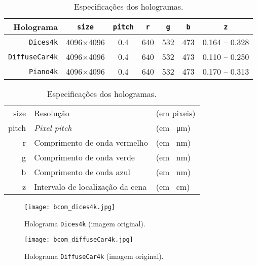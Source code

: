 \begin{table}[!htbp]
    \centering
    \caption[Especificações dos hologramas]{Especificações dos hologramas\cite{holorepo2018}.}
    \label{tab:holo-specs}
    \begin{tabular}{r c c c c c c}
        \toprule
        Holograma & \verb|size| & \verb|pitch| & \verb|r| & \verb|g| & \verb|b| & \verb|z| \\
        \midrule
        \texttt{Dices4k} & 4096$\times$4096 & \SI{0.4}{} & \SI{640}{} & \SI{532}{} & \SI{473}{} & \SI{0.164}{} -- \SI{0.328}{} \\
        \texttt{DiffuseCar4k} & 4096$\times$4096 & \SI{0.4}{} & \SI{640}{} & \SI{532}{} & \SI{473}{} & \SI{0.110}{} -- \SI{0.250}{} \\
        \texttt{Piano4k} & 4096$\times$4096 & \SI{0.4}{} & \SI{640}{} & \SI{532}{} & \SI{473}{} & \SI{0.170}{} -- \SI{0.313}{} \\
        \bottomrule
    \end{tabular}
    \subcaption*{}
    \begin{tabular}{>{\ttfamily}r @{~:~~} l l}
        size & Resolução & (em pixeis) \\
        pitch & \textit{Pixel pitch} & (em \SI{}{\micro\meter}) \\
        r & Comprimento de onda vermelho & (em \SI{}{\nano\meter}) \\
        g & Comprimento de onda verde & (em \SI{}{\nano\meter}) \\
        b & Comprimento de onda azul & (em \SI{}{\nano\meter}) \\
        z & Intervalo de localização da cena & (em \SI{}{\centi\meter}) \\
    \end{tabular}
\end{table}



\begin{figure}
    \centering
    \texttt{[image: bcom\_dices4k.jpg]}
    \caption[Holograma \texttt{Dices4k} (imagem original)]{Holograma \texttt{Dices4k} (imagem original)\cite{Gilles2016,Gilles2016a,holorepo2018}.}
    \label{fig:bcom_dices4k}
\end{figure}

\begin{figure}
    \centering
    \texttt{[image: bcom\_diffuseCar4k.jpg]}
    \caption[Holograma \texttt{DiffuseCar4k} (imagem original)]{Holograma \texttt{DiffuseCar4k} (imagem original)\cite{Gilles2016,Gilles2016a,holorepo2018}.}
    \label{fig:bcom_diffuseCar4k}
\end{figure}

